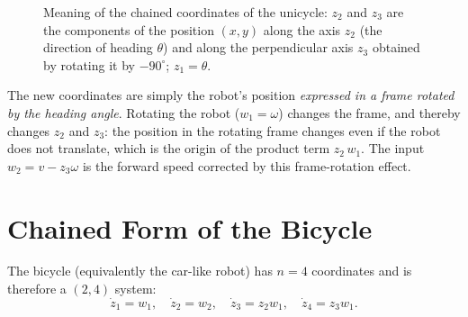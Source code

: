 \documentclass[11pt,a4paper]{article}
\theoremstyle{definition}
\theoremstyle{plain}
\begin{document}
\begin{figure}[ht]
\centering
{}
\caption{Meaning of the chained coordinates of the unicycle: $z_2$ and $z_3$ are the components of the position $(x,y)$ along the axis $z_2$ (the direction of heading $\theta$) and along the perpendicular axis $z_3$ obtained by rotating it by $-90^\circ$; $z_1=\theta$.}
\end{figure}

\begin{intuition}
The new coordinates are simply the robot's position \emph{expressed in a frame rotated by the heading angle}. Rotating the robot ($w_1=\omega$) changes the frame, and thereby changes $z_2$ and $z_3$: the position in the rotating frame changes even if the robot does not translate, which is the origin of the product term $z_2\,w_1$. The input $w_2=v-z_3\omega$ is the forward speed corrected by this frame-rotation effect.
\end{intuition}

\section{Chained Form of the Bicycle}

The bicycle (equivalently the car-like robot) has $n=4$ coordinates and is therefore a $(2,4)$ system:
\[
 \dot z_1=w_1,\quad \dot z_2=w_2,\quad\dot z_3=z_2w_1,\quad\dot z_4=z_3w_1 .
\]
\end{document}
